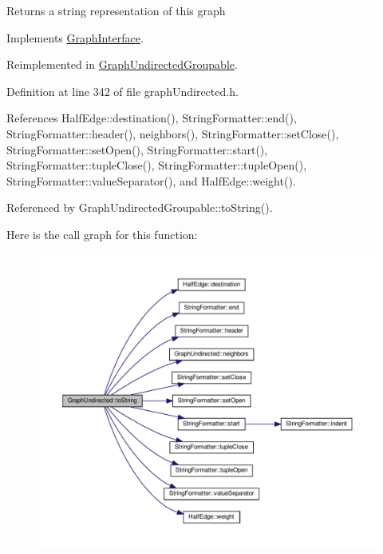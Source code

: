 \begin{DoxyReturn}{Returns}
a string representation of this graph 
\end{DoxyReturn}


Implements \hyperlink{classGraphInterface_ac6d3da524ca5c95c3ebd80d2b0d5d762}{Graph\+Interface}.



Reimplemented in \hyperlink{classGraphUndirectedGroupable_a615f30036acfdd33e45b82dc47e7d174}{Graph\+Undirected\+Groupable}.



Definition at line 342 of file graph\+Undirected.\+h.



References Half\+Edge\+::destination(), String\+Formatter\+::end(), String\+Formatter\+::header(), neighbors(), String\+Formatter\+::set\+Close(), String\+Formatter\+::set\+Open(), String\+Formatter\+::start(), String\+Formatter\+::tuple\+Close(), String\+Formatter\+::tuple\+Open(), String\+Formatter\+::value\+Separator(), and Half\+Edge\+::weight().



Referenced by Graph\+Undirected\+Groupable\+::to\+String().

Here is the call graph for this function\+:
\nopagebreak
\begin{figure}[H]
\begin{center}
\leavevmode
\includegraphics[width=350pt]{classGraphUndirected_a61604a0840f044d52a2762f44635fa9c_cgraph}
\end{center}
\end{figure}
\mbox{\label{classGraphUndirected_a41ba96531c669461dbc7e11ee35796ab}} 
